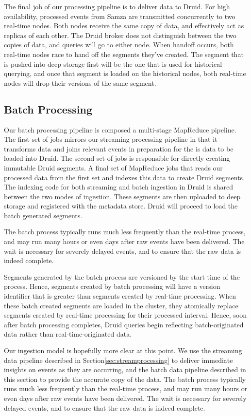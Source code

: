 \documentclass{vldb}
\begin{document}
{The final job of our processing pipeline is to deliver data to Druid. For high
availability, processed events from Samza are transmitted concurrently to two
real-time nodes. Both nodes receive the same copy of data, and effectively act
as replicas of each other. The Druid broker does not distinguish between the
two copies of data, and queries will go to either node. When handoff occurs,
both real-time nodes race to hand off the segments they’ve created. The segment
that is pushed into deep storage first will be the one that is used for
historical querying, and once that segment is loaded on the historical nodes,
both real-time nodes will drop their versions of the same segment.

\subsection{Batch Processing}
Our batch processing pipeline is composed a multi-stage
MapReduce\cite{dean2008mapreduce} pipeline. The first set of jobs mirrors our
streaming processing pipeline in that it transforms data and joins relevant
events in preparation for the is data to be loaded into Druid. The second set
of jobs is responsible for directly creating immutable Druid segments. A final
set of MapReduce jobs that reads our processed data from the first set and
indexes this data to create Druid segments. The indexing code for both
streaming and batch ingestion in Druid is shared between the two modes of
ingestion. These segments are then uploaded to deep storage and registered with
the  metadata store. Druid will proceed to load the batch generated segments.

The batch process typically runs much less frequently than the real-time
process, and may run many hours or even days after raw events have been
delivered. The wait is necessary for severely delayed events, and to ensure
that the raw data is indeed complete. 

Segments generated by the batch process are versioned by the start time of the
process. Hence, segments created by batch processing will have a version
identifier that is greater than segments created by real-time processing. When
these batch created segments are loaded in the cluster, they atomically replace
segments created by real-time processing for their processed interval. Hence,
soon after batch processing completes, Druid queries begin reflecting
batch-originated data rather than real-time-originated data.


Our ingestion model is hopefully more clear at this point. We use the streaming
data pipeline described in Section\ref{sec:streamprocessing} to deliver
immediate insights on events as they are occurring, and the batch data pipeline
described in this section to provide the accurate copy of the data. The batch
process typically runs much less frequently than the real-time process, and may
run many hours or even days after raw events have been delivered. The wait is
necessary for severely delayed events, and to ensure that the raw data is
indeed complete. 

}
\end{document}
